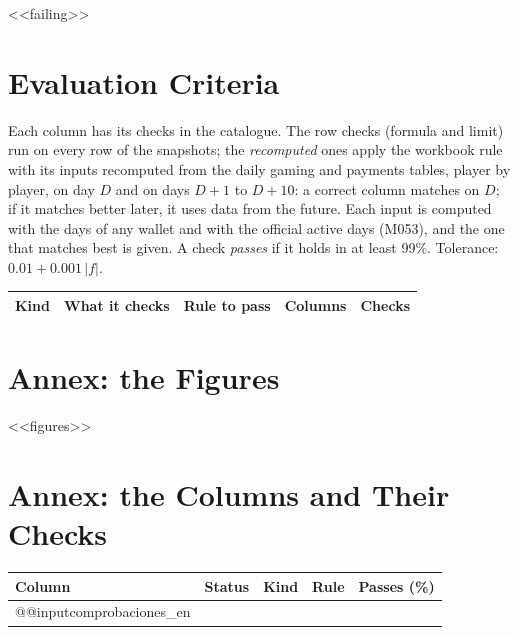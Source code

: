 <<failing>>

\section{Evaluation Criteria}
Each column has its checks in the catalogue. The row checks (formula and limit) run on every row of the snapshots; the \emph{recomputed} ones apply the workbook rule with its inputs recomputed from the daily gaming and payments tables, player by player, on day $D$ and on days $D+1$ to $D+10$: a correct column matches on $D$; if it matches better later, it uses data from the future. Each input is computed with the days of any wallet and with the official active days (M053), and the one that matches best is given. A check \emph{passes} if it holds in at least 99\%. Tolerance: $0.01 + 0.001\,|f|$.

\begin{center}\small
\begin{tabular}{@{}>{\raggedright\arraybackslash}p{2.1cm}>{\raggedright\arraybackslash}p{5.6cm}>{\raggedright\arraybackslash}p{4.3cm}rr@{}}
\toprule
Kind & What it checks & Rule to pass & Columns & Checks\\
\midrule

\end{tabular}
\end{center}

\clearpage
\appendix
\section{Annex: the Figures}\label{sec:figures}
<<figures>>

\clearpage
\section{Annex: the Columns and Their Checks}\label{sec:columns}\label{sec:checks}
\begin{small}
\setlength{\tabcolsep}{4pt}
\begin{longtable}{@{}>{\raggedright\arraybackslash}p{3.7cm}>{\raggedright\arraybackslash}p{2.4cm}>{\raggedright\arraybackslash}p{2.1cm}>{\raggedright\arraybackslash}p{4.8cm}r@{}}
\toprule
Column & Status & Kind & Rule & Passes (\%)\\
\midrule
\endhead
\bottomrule
\endfoot
\csname @@input\endcsname comprobaciones_en   %
\end{longtable}
\end{small}


